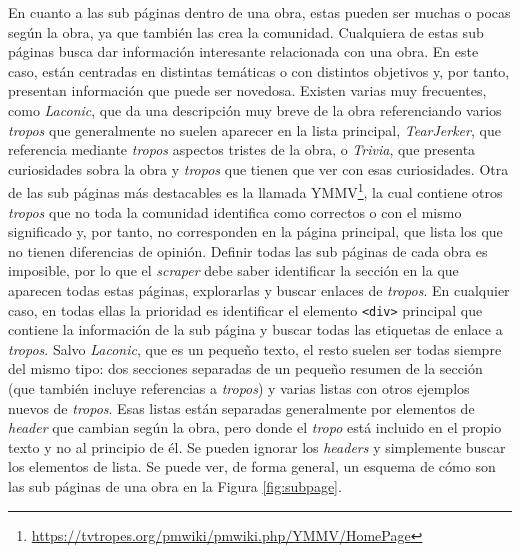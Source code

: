 En cuanto a las sub páginas dentro de una obra, estas pueden ser muchas o pocas
según la obra, ya que también las crea la comunidad. Cualquiera de estas sub
páginas busca dar información interesante relacionada con una obra. En este
caso, están centradas en distintas temáticas o con distintos objetivos y, por
tanto, presentan información que puede ser novedosa. Existen varias muy
frecuentes, como \textit{Laconic}, que da una descripción muy breve de la obra
referenciando varios \textit{tropos} que generalmente no suelen aparecer en la
lista principal, \textit{TearJerker}, que referencia mediante \textit{tropos}
aspectos tristes de la obra, o \textit{Trivia}, que presenta curiosidades sobra
la obra y \textit{tropos} que tienen que ver con esas curiosidades. Otra de las
sub páginas más destacables es la llamada
YMMV\footnote{\url{https://tvtropes.org/pmwiki/pmwiki.php/YMMV/HomePage}}, la
cual contiene otros \textit{tropos} que no toda la comunidad identifica como
correctos o con el mismo significado y, por tanto, no corresponden en la página
principal, que lista los que no tienen diferencias de opinión. Definir todas las
sub páginas de cada obra es imposible, por lo que el \textit{scraper} debe saber
identificar la sección en la que aparecen todas estas páginas, explorarlas y
buscar enlaces de \textit{tropos}. En cualquier caso, en todas ellas la
prioridad es identificar el elemento \texttt{<div>} principal que contiene la
información de la sub página y buscar todas las etiquetas de enlace a
\textit{tropos}. Salvo \textit{Laconic}, que es un pequeño texto, el resto
suelen ser todas siempre del mismo tipo: dos secciones separadas de un pequeño
resumen de la sección (que también incluye referencias a \textit{tropos}) y
varias listas con otros ejemplos nuevos de \textit{tropos}. Esas listas están
separadas generalmente por elementos de \textit{header} que cambian según la
obra, pero donde el \textit{tropo} está incluido en el propio texto y no al
principio de él. Se pueden ignorar los \textit{headers} y simplemente buscar los
elementos de lista. Se puede ver, de forma general, un esquema de cómo son las
sub páginas de una obra en la Figura \ref{fig:subpage}.

